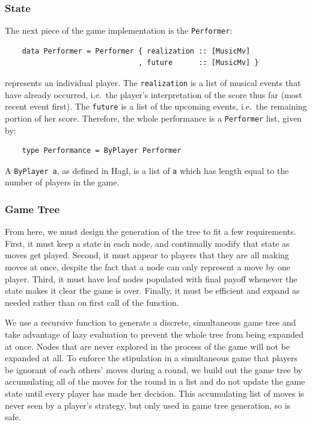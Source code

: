\documentclass{article}
\begin{document}
\subsubsection{State}
The next piece of the game implementation is the \texttt{Performer}:

\begin{verbatim}
    data Performer = Performer { realization :: [MusicMv]
                               , future      :: [MusicMv] }
\end{verbatim}

represents an individual player. The 
\texttt{realization} is
a list of musical events that have already occurred, i.e.~the player's
interpretation of the score thus far (most recent event first). The
\texttt{future} is a list of the upcoming events, i.e.~the remaining portion of
her score. Therefore, the whole performance is a \texttt{Performer} list, given by:

\begin{verbatim}
    type Performance = ByPlayer Performer
\end{verbatim}

A \texttt{ByPlayer a}, as defined in Hagl, is a list of \texttt{a} which
has length equal to the number of players in the game.

\subsubsection{Game Tree}
From here, we must design the generation of the tree to fit a few
requirements. First, it must keep a state in each node, and continually
modify that state as moves get played. Second, it must appear to players
that they are all making moves at once, despite the fact that a node can
only represent a move by one player. Third, it must have leaf nodes
populated with final payoff whenever the state makes it clear the game
is over. Finally, it must be efficient and expand as needed rather than
on first call of the function.

We use a recursive function to generate a discrete, simultaneous game tree and take advantage of
lazy evaluation to prevent the whole tree from being expanded at
once. Nodes that are never explored in the process of the game will
not be expanded at all. To enforce the stipulation in a simultaneous
game that players be ignorant of each others' moves during a round, 
we build out the game tree by accumulating all of the moves for
the round in a list and do not update the game state until every player
has made her decision. This accumulating list of moves is never seen by
a player's strategy, but only used in game tree generation, so is safe.
\end{document}
